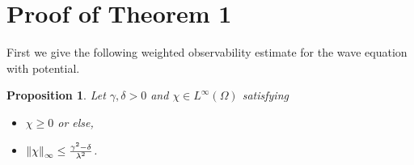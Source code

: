 \documentclass[11pt,reqno]{amsart}
\theoremstyle{plain}
\newtheorem{proposition}{Proposition}
\numberwithin{equation}{section}
\numberwithin{equation}{section}
\begin{document}
\section{Proof of Theorem 1}

First we give the following weighted observability estimate for the wave
equation with potential.

\begin{proposition}
\label{observability lemma} Let $\gamma ,\delta >0$ and $\chi \in L^{\infty
}(\Omega )$ satisfying

\begin{itemize}
\item $\chi \geq 0$ or else,

\item $\left\Vert \chi \right\Vert _{\infty }\leq \frac{\gamma ^{2}-\delta }{%
\lambda ^{2}}$.
\end{itemize}


\end{proposition}
\end{document}

